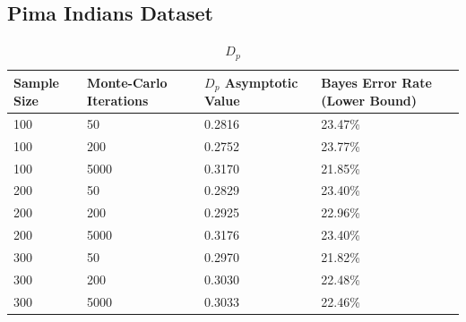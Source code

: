 \documentclass{article}
\begin{document}
		\subsection*{\small Pima Indians Dataset}
\begin{table}[h]		
	\caption{$D_p$}
		\begin{center}
		\begin{tabular}[h]{ |p{3cm}||p{3cm}|p{3cm}|p{3cm}|  }

			\hline
				Sample Size & Monte-Carlo Iterations & $D_p$ Asymptotic Value & Bayes Error Rate (Lower Bound) \\ [0.5ex] 
				\hline\hline
				100	& 50	& 0.2816	& 23.47\% \\
				
				\hline
				
				100	& 200	& 0.2752	& 23.77\% \\
				\hline
				
				100	& 5000	& 0.3170	& 21.85\% \\
				
				\hline
				200	& 50	& 0.2829	& 23.40\% \\
				
				\hline
				200	& 200	& 0.2925	& 22.96\% \\
				
				\hline
				200	& 5000 & 0.3176		& 23.40\% \\
				
				\hline
				300	& 50	& 0.2970	& 21.82\% \\
				
				\hline
				300	& 200	& 0.3030	& 22.48\% \\
				\hline
				300	& 5000	& 0.3033	& 22.46\% \\ 
				\hline 		
			\end{tabular}
		\end{center}
\end{table}			
	
\end{document}
